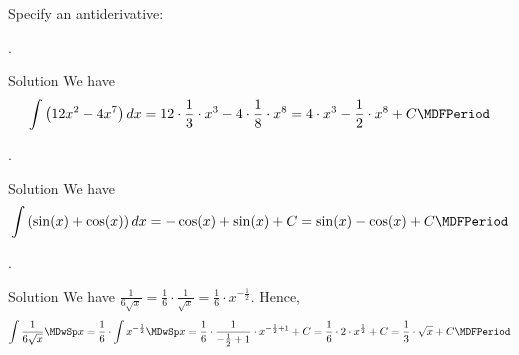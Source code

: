 \begin{MExercises}

\begin{MExercise}
Specify an antiderivative:
\begin{MExerciseItems}
\item{
{}.
\begin{MHint}{Solution}{%
We have
\[
\int \left(12 x^2 - 4 x^7\right) \MD x %
= 12 \cdot \frac{1}{3} \cdot x^3 - 4 \cdot \frac{1}{8} \cdot x^8 %
= 4 \cdot x^3 - \frac{1}{2} \cdot x^8 + C\MDFPeriod %
\]
}
\end{MHint}}
%
\item{
{}.
\begin{MHint}{Solution}{%
We have
\[
\int \left(\sin(x) + \cos(x)\right) \MD x %
= -\cos(x) + \sin(x) + C %
= \sin(x) - \cos(x) + C\MDFPeriod %
\]
}\end{MHint}}
\item{
{}. 
\begin{MHint}{Solution}{%
We have
$\frac{1}{6 \sqrt{x}} = \frac{1}{6} \cdot \frac{1}{\sqrt{x}} %
= \frac{1}{6} \cdot x^{-\frac{1}{2}}$. Hence,
\[
\int \frac{1}{6 \sqrt{x}} \MDwSp x %
= \frac{1}{6} \cdot \int x^{-\frac{1}{2}} \MDwSp x %
= \frac{1}{6} \cdot \frac{1}{-\frac{1}{2} + 1} \cdot x^{-\frac{1}{2} + 1} + C %
= \frac{1}{6} \cdot 2 \cdot x^{\frac{1}{2}} + C %
= \frac{1}{3} \cdot \sqrt{x} + C\MDFPeriod %
\]
}
\end{MHint}}
\end{MExerciseItems}
\end{MExercise}


\end{MExercises}
